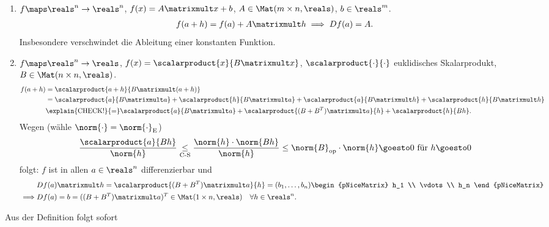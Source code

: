 \begin{beispiele*}
    \begin{enumerate}
        \item \( f\maps \reals^n\to \reals^n \), \( f(x)=A\matrixmult x+b \), \( A\in \Mat(m\times n, \reals) \), \( b\in \reals^m \).
        \begin{align*}
            f(a+h)=f(a)+A\matrixmult h\implies Df(a)=A.
        \end{align*}
        Insbesondere verschwindet die Ableitung einer konstanten Funktion.
    \item \( f\maps \reals^n \to \reals\), \( f(x)=\scalarproduct{x}{B\matrixmult x} \), \( \scalarproduct{\cdot}{\cdot} \) euklidisches Skalarprodukt, \( B\in \Mat(n\times n, \reals) \).
    \begin{align*}
        f(a+h)\begin{aligned}[t]
            &=\scalarproduct{a+h}{B\matrixmult (a+h)}\\
            &=\scalarproduct{a}{B\matrixmult a}+\scalarproduct{h}{B\matrixmult a}+\scalarproduct{a}{B\matrixmult h}+\scalarproduct{h}{B\matrixmult h}\\
            &\explain{\text{CHECK!}}{=}\scalarproduct{a}{B\matrixmult a}+\scalarproduct{(B+B^T)\matrixmult a}{h}+\scalarproduct{h}{Bh}. 
        \end{aligned}                
    \end{align*}
    Wegen (wähle \( \norm{\cdot}=\norm{\cdot}_{\text{E}} \))
    \begin{align*}
        \frac{\scalarproduct{a}{Bh}}{\norm{h}}\underset{\text{C-S}}{\leq}\frac{\norm{h}\cdot\norm{Bh}}{\norm{h}}\leq \norm{B}_{\text{op}}\cdot\norm{h}\goesto 0  \text{ für }h\goesto 0
    \end{align*}
    folgt: \( f \) ist in allen \( a\in \reals^n \) differenzierbar und
    \begin{align*}
        &Df(a)\matrixmult h=\scalarproduct{(B+B^T)\matrixmult a}{h}=(b_1,\dots,b_n)\begin{pNiceMatrix} h_1 \\ \vdots \\ h_n \end{pNiceMatrix}\\
        \implies &Df(a)=b=((B+B^T)\matrixmult a)^T\in \Mat(1\times n,\reals)\quad \forall h\in \reals^n. 
    \end{align*}
    \end{enumerate}
\end{beispiele*}
Aus der Definition folgt sofort
